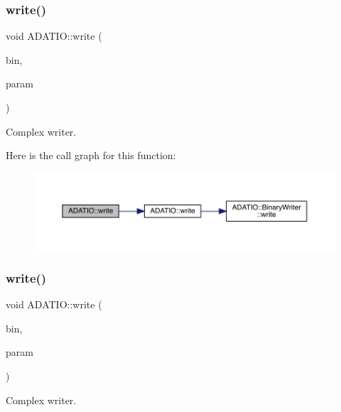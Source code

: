 \subsubsection{\texorpdfstring{write()}{write()}\hspace{0.1cm}{\footnotesize\ttfamily [13/25]}}
{\footnotesize\ttfamily void A\+D\+A\+T\+I\+O\+::write (\begin{DoxyParamCaption}\item[{\mbox{\hyperlink{classADATIO_1_1BinaryWriter}{Binary\+Writer}} \&}]{bin,  }\item[{const std\+::complex$<$ float $>$ \&}]{param }\end{DoxyParamCaption})}



Complex writer. 

Here is the call graph for this function\+:\nopagebreak
\begin{figure}[H]
\begin{center}
\leavevmode
\includegraphics[width=350pt]{d0/dba/namespaceADATIO_a653bde19d92b24f8269adfa361bdabda_cgraph}
\end{center}
\end{figure}
\mbox{\label{namespaceADATIO_a4d080cdbb3d8b34b2e8cf03001f8b7f0}} 
\subsubsection{\texorpdfstring{write()}{write()}\hspace{0.1cm}{\footnotesize\ttfamily [14/25]}}
{\footnotesize\ttfamily void A\+D\+A\+T\+I\+O\+::write (\begin{DoxyParamCaption}\item[{\mbox{\hyperlink{classADATIO_1_1BinaryWriter}{Binary\+Writer}} \&}]{bin,  }\item[{const std\+::complex$<$ double $>$ \&}]{param }\end{DoxyParamCaption})}



Complex writer. 

